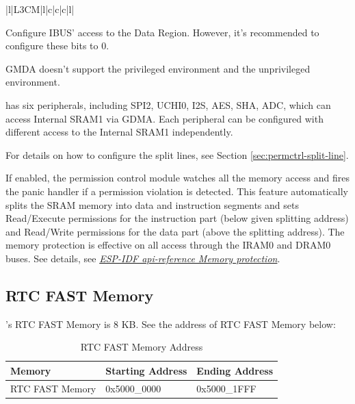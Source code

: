 \documentclass[main\_\_EN.tex]{subfiles}
\begin{document}
\begin{table}[H]
\begin{threeparttable}
\begin{tabular}{ |l|L{3CM}|l|c|c|c|l| }
    \end{tabular}
        \begin{tablenotes}
            \item [A] Configure IBUS' access to the Data Region. However, it's recommended to configure these bits to 0.
            \item [B] GMDA doesn't support the privileged environment and the unprivileged environment.
            \item [C] \chipname{} has six peripherals, including SPI2, UCHI0, I2S, AES, SHA, ADC, which can access Internal SRAM1 via GDMA. Each peripheral can be configured with different access to the Internal SRAM1 independently.
            \end{tablenotes}
     \end{threeparttable}
\end{table}

For details on how to configure the split lines, see Section \ref{sec:permctrl-split-line}.

\begin{tiplisting}
If enabled, the permission control module watches all the memory access and fires the panic handler if a permission violation is detected. This feature automatically splits the SRAM memory into data and instruction segments and sets Read/Execute permissions for the instruction part (below given splitting address) and Read/Write permissions for the data part (above the splitting address). The memory protection is effective on all access through the IRAM0 and DRAM0 buses.
See details, see  {\it{\href{https://docs.espressif.com/projects/esp-idf/zh_CN/v4.3-beta1/esp32c3/api-reference/kconfig.html#memory-protection}{ESP-IDF api-reference Memory protection}}}.
\end{tiplisting}


\subsection{RTC FAST Memory}

\chipname{}'s RTC FAST Memory is 8 KB. See the address of RTC FAST Memory below:

\begin{longtable}[c]{ |l|l|l| }
\caption{RTC FAST Memory Address}
\label{tab:fast-memory-address}
\\\hline
\rowcolor{lightgray}
    \textbf{Memory} &  \textbf{Starting Address}  &  \textbf{Ending Address}\\
    \hline
    RTC FAST Memory          & 0x5000\_0000 &  0x5000\_1FFF   \\
    \hline
\end{longtable}
\end{document}
